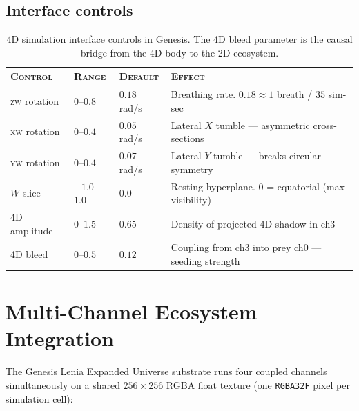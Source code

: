 \documentclass[11pt,a4paper]{article}
\begin{document}
\subsection{Interface controls}

\begin{table}[h!]
\small\sffamily
\renewcommand{\arraystretch}{1.25}
\begin{tabularx}{\linewidth}{@{}l l l >{\raggedright\arraybackslash}X@{}}
\toprule
\textsc{Control} & \textsc{Range} & \textsc{Default} & \textsc{Effect}\\
\midrule
\textsc{zw} rotation & $0$–$0.8$   & $0.18$ rad/s & Breathing rate. $0.18 \approx 1$ breath / $35$ sim-sec\\
\textsc{xw} rotation & $0$–$0.4$   & $0.05$ rad/s & Lateral $X$ tumble --- asymmetric cross-sections\\
\textsc{yw} rotation & $0$–$0.4$   & $0.07$ rad/s & Lateral $Y$ tumble --- breaks circular symmetry\\
$W$ slice            & $-1.0$–$1.0$ & $0.0$        & Resting hyperplane. $0$ = equatorial (max visibility)\\
4D amplitude         & $0$–$1.5$   & $0.65$        & Density of projected 4D shadow in ch3\\
4D bleed             & $0$–$0.5$   & $0.12$        & Coupling from ch3 into prey ch0 --- seeding strength\\
\bottomrule
\end{tabularx}
\caption{\small 4D simulation interface controls in Genesis. The 4D bleed
parameter is the causal bridge from the 4D body to the 2D ecosystem.}
\end{table}

\section{Multi-Channel Ecosystem Integration}

The Genesis Lenia Expanded Universe substrate runs four coupled channels
simultaneously on a shared $256\times 256$ RGBA float texture (one
\texttt{RGBA32F} pixel per simulation cell):
\end{document}
